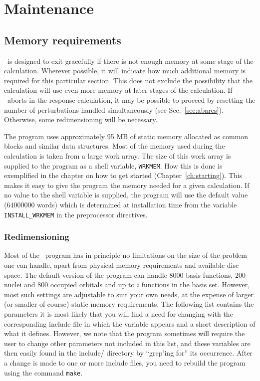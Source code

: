 \chapter{Maintenance}\label{ch:maintain}

\section{Memory requirements}

\dalton\ is designed to exit gracefully if there is not enough
memory at some stage of the calculation.  Wherever possible, it
will indicate how much additional memory is required for this
particular section.  This does not exclude the possibility that
the calculation will use even more memory at later stages of the
calculation. If \dalton\ aborts in the response calculation, it
may be possible to proceed by resetting the number of
perturbations handled simultaneously (see 
Sec.~\ref{sec:abares}).  Otherwise, some redimensioning will be
necessary.

The program uses approximately 95 MB of static memory allocated as common
blocks and similar data structures. Most of the memory used during the
calculation is taken from a large work array. The size of this work
array is supplied to the program as a shell
variable, \verb|WRKMEM|.
How this is done is exemplified in the chapter on how to get started
(Chapter~\ref{ch:starting}). This makes it easy
to give the program the memory needed for a given calculation. If no
value to the shell 
variable is supplied, the program will use the default value
(64000000 words) which is
determined at installation time from the variable
\verb|INSTALL_WRKMEM| in the preprocessor
directives.

\subsection{Redimensioning \dalton}

Most of the \dalton\ program has in principle no limitations on
the size of the problem one can handle, apart from
physical memory requirements and available disc space. The default
version of the program can handle 8000 basis functions, 200 nuclei and
800 occupied orbitals and up to $i$ functions in the basis
set. However, most such settings are adjustable to suit your own
needs, at the expense of larger (or smaller of course) static memory
requirements. The following list contains the parameters it is
most likely that you will find a need for changing with the
corresponding include 
file in which the variable appears and a short description of what
it defines. However, we note that the program sometimes will
require the user to change other parameters not included in this
list, and these variables are then easily found in the include/
directory by ``grep'ing for'' its occurrence. After a
change is made to one or more include files, you need to
rebuild the program using the
command \verb|make|.

